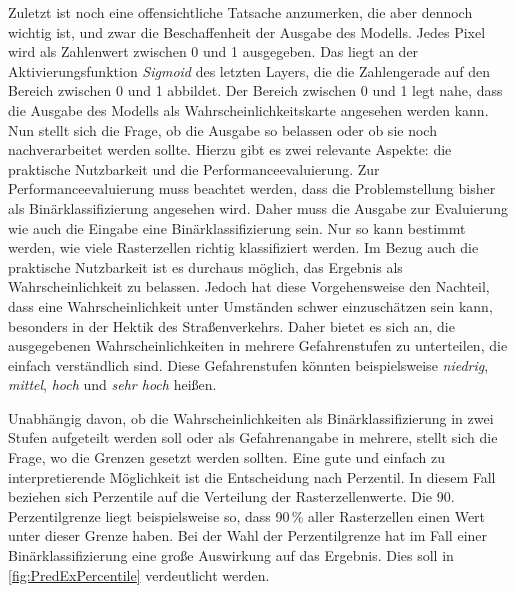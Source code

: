 Zuletzt ist noch eine offensichtliche Tatsache anzumerken, die aber dennoch wichtig ist, und zwar die Beschaffenheit der Ausgabe des Modells.
Jedes Pixel wird als Zahlenwert zwischen 0 und 1 ausgegeben.
Das liegt an der Aktivierungsfunktion \emph{Sigmoid} des letzten Layers, die die Zahlengerade auf den Bereich zwischen 0 und 1 abbildet.
Der Bereich zwischen 0 und 1 legt nahe, dass die Ausgabe des Modells als Wahrscheinlichkeitskarte angesehen werden kann.
Nun stellt sich die Frage, ob die Ausgabe so belassen oder ob sie noch nachverarbeitet werden sollte.
Hierzu gibt es zwei relevante Aspekte: die praktische Nutzbarkeit und die Performanceevaluierung.
Zur Performanceevaluierung muss beachtet werden, dass die Problemstellung bisher als Binärklassifizierung angesehen wird.
Daher muss die Ausgabe zur Evaluierung wie auch die Eingabe eine Binärklassifizierung sein.
Nur so kann bestimmt werden, wie viele Rasterzellen richtig klassifiziert werden.
Im Bezug auch die praktische Nutzbarkeit ist es durchaus möglich, das Ergebnis als Wahrscheinlichkeit zu belassen.
Jedoch hat diese Vorgehensweise den Nachteil, dass eine Wahrscheinlichkeit unter Umständen schwer einzuschätzen sein kann, besonders in der Hektik des Straßenverkehrs.
Daher bietet es sich an, die ausgegebenen Wahrscheinlichkeiten in mehrere Gefahrenstufen zu unterteilen, die einfach verständlich sind.
Diese Gefahrenstufen könnten beispielsweise \emph{niedrig}, \emph{mittel}, \emph{hoch} und \emph{sehr hoch} heißen.

Unabhängig davon, ob die Wahrscheinlichkeiten als Binärklassifizierung in zwei Stufen aufgeteilt werden soll oder als Gefahrenangabe in mehrere, stellt sich die Frage, wo die Grenzen gesetzt werden sollten.
Eine gute und einfach zu interpretierende Möglichkeit ist die Entscheidung nach Perzentil.
In diesem Fall beziehen sich Perzentile auf die Verteilung der Rasterzellenwerte.
Die 90. Perzentilgrenze liegt beispielsweise so, dass 90\,\% aller Rasterzellen einen Wert unter dieser Grenze haben.
Bei der Wahl der Perzentilgrenze hat im Fall einer Binärklassifizierung eine große Auswirkung auf das Ergebnis.
Dies soll in \autoref{fig:PredExPercentile} verdeutlicht werden.

